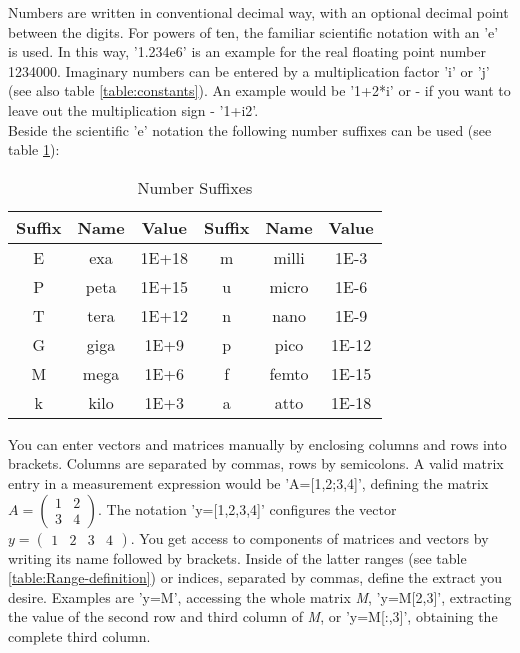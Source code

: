 
Numbers are written in conventional decimal way, with an optional
decimal point between the digits. For powers of ten, the familiar
scientific notation with an 'e' is used. In this way, '1.234e6' is an
example for the real floating point number 1234000. Imaginary numbers
can be entered by a multiplication factor 'i' or 'j' (see also table
\ref{table:constants}).  An example would be '1+2{*}i' or - if you
want to leave out the multiplication sign - '1+i2'.\\
Beside the scientific 'e' notation the following number suffixes can be used (see table \ref{table:Number-suffixes}):

\begin{table}[ht]
\begin{center}\begin{tabular}{|c|c|c||c|c|c|}
\hline 
Suffix&
Name&
Value&
Suffix&
Name&
Value\tabularnewline
\hline
\hline 
E & exa & 1E+18 & m & milli & 1E-3\tabularnewline\hline
P & peta & 1E+15 & u & micro & 1E-6\tabularnewline\hline
T & tera & 1E+12 & n & nano & 1E-9\tabularnewline\hline
G & giga & 1E+9 & p & pico & 1E-12\tabularnewline\hline
M & mega & 1E+6 & f & femto & 1E-15\tabularnewline\hline
k & kilo & 1E+3 & a & atto & 1E-18\tabularnewline\hline
\end{tabular}\end{center}


\caption{\label{table:Number-suffixes}Number Suffixes}
\end{table}



You can enter vectors and matrices manually by enclosing columns and rows into brackets. Columns are separated by commas, rows by semicolons. A valid matrix entry in a measurement expression would be 'A=[1,2;3,4]', defining the matrix
$A=\begin{pmatrix} 1 & 2 \\ 3 & 4 \end{pmatrix}$. The notation 'y=[1,2,3,4]' configures the vector $y=\begin{pmatrix} 1 & 2 & 3 & 4 \end{pmatrix}$.
You get access to components of matrices and vectors by writing its name followed by brackets. Inside of the latter ranges (see table \ref{table:Range-definition}) or indices, separated by commas, define the extract you desire. Examples are 'y=M', accessing the whole matrix \textit{M}, 'y=M[2,3]', extracting the value of the second row and third column of \textit{M}, or 'y=M[:,3]', obtaining the complete third column.

